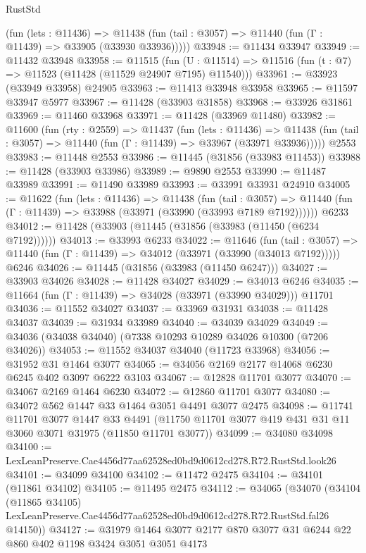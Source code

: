 \begin{lexlean}{RustStd}
\begin{coremodule}
      (fun (lets : @11436) =>
      @11438 (fun (tail : @3057) => @11440 (fun (Γ : @11439) => @33905 (@33930 @33936)))))
@33948 := @11434 @33947
@33949 := @11432 @33948
@33958 := @11515
    (fun (U : @11514) => @11516 (fun (t : @7) => @11523 (@11428 (@11529 @24907 @7195) @11540)))
@33961 := @33923 (@33949 @33958) @24905
@33963 := @11413 @33948 @33958
@33965 := @11597 @33947 @5977
@33967 := @11428 (@33903 @31858)
@33968 := @33926 @31861
@33969 := @11460 @33968
@33971 := @11428 (@33969 @11480)
@33982 := @11600
    (fun (rty : @2559) =>
    @11437
      (fun (lets : @11436) =>
      @11438 (fun (tail : @3057) => @11440 (fun (Γ : @11439) => @33967 (@33971 @33936)))))
    @2553
@33983 := @11448 @2553
@33986 := @11445 (@31856 (@33983 @11453))
@33988 := @11428 (@33903 @33986)
@33989 := @9890 @2553
@33990 := @11487 @33989
@33991 := @11490 @33989
@33993 := @33991 @33931 @24910
@34005 := @11622
    (fun (lets : @11436) =>
    @11438
      (fun (tail : @3057) =>
      @11440 (fun (Γ : @11439) => @33988 (@33971 (@33990 (@33993 @7189 @7192))))))
    @6233
@34012 := @11428 (@33903 (@11445 (@31856 (@33983 (@11450 (@6234 @7192))))))
@34013 := @33993 @6233
@34022 := @11646
    (fun (tail : @3057) => @11440 (fun (Γ : @11439) => @34012 (@33971 (@33990 (@34013 @7192)))))
    @6246
@34026 := @11445 (@31856 (@33983 (@11450 @6247)))
@34027 := @33903 @34026
@34028 := @11428 @34027
@34029 := @34013 @6246
@34035 := @11664 (fun (Γ : @11439) => @34028 (@33971 (@33990 @34029))) @11701
@34036 := @11552 @34027
@34037 := @33969 @31931
@34038 := @11428 @34037
@34039 := @31934 @33989
@34040 := @34039 @34029
@34049 := @34036 (@34038 @34040) (@7338 @10293 @10289 @34026 @10300 (@7206 @34026))
@34053 := @11552 @34037 @34040 (@11723 @33968)
@34056 := @31952 @31 @1464 @3077
@34065 := @34056 @2169 @2177 @14068 @6230 @6245 @402 @3097 @6222 @3103
@34067 := @12828 @11701 @3077
@34070 := @34067 @2169 @1464 @6230
@34072 := @12860 @11701 @3077
@34080 := @34072 @562 @1447 @33 @1464 @3051 @4491 @3077 @2475
@34098 := @11741
    @11701
    @3077
    @1447
    @33
    @4491
    (@11750 @11701 @3077 @419 @431 @31 @11 @3060 @3071 @31975 (@11850 @11701 @3077))
@34099 := @34080 @34098
@34100 := LexLeanPreserve.Cae4456d77aa62528ed0bd9d0612cd278.R72.RustStd.look26
@34101 := @34099 @34100
@34102 := @11472 @2475
@34104 := @34101 (@11861 @34102)
@34105 := @11495 @2475
@34112 := @34065
    (@34070
      (@34104
        (@11865 @34105)
        LexLeanPreserve.Cae4456d77aa62528ed0bd9d0612cd278.R72.RustStd.fal26
        @14150))
@34127 := @31979 @1464 @3077 @2177 @870 @3077 @31 @6244 @22 @860 @402 @1198 @3424 @3051 @3051 @4173

\end{coremodule}
\end{lexlean}
